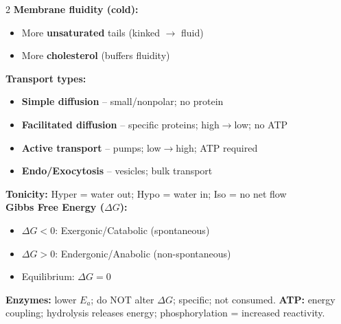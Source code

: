 \documentclass[11pt, letterpaper]{article}
\begin{document}
\begin{tcolorbox}[colback=part5bg, colframe=sectionteal,
  title={\bfseries Membranes, Transport \& Energy}, arc=3pt, boxrule=1pt]
\begin{multicols}{2}
\textbf{Membrane fluidity (cold):}
\begin{itemize}[noitemsep, leftmargin=*]
  \item More \textbf{unsaturated} tails (kinked $\to$ fluid)
  \item More \textbf{cholesterol} (buffers fluidity)
\end{itemize}
\textbf{Transport types:}
\begin{itemize}[noitemsep, leftmargin=*]
  \item \textbf{Simple diffusion} -- small/nonpolar; no protein
  \item \textbf{Facilitated diffusion} -- specific proteins; high$\to$low; no ATP
  \item \textbf{Active transport} -- pumps; low$\to$high; ATP required
  \item \textbf{Endo/Exocytosis} -- vesicles; bulk transport
\end{itemize}
\columnbreak
\textbf{Tonicity:} Hyper = water out; Hypo = water in; Iso = no net flow\\[4pt]
\textbf{Gibbs Free Energy ($\Delta G$):}
\begin{itemize}[noitemsep, leftmargin=*]
  \item $\Delta G < 0$: Exergonic/Catabolic (spontaneous)
  \item $\Delta G > 0$: Endergonic/Anabolic (non-spontaneous)
  \item Equilibrium: $\Delta G = 0$
\end{itemize}
\textbf{Enzymes:} lower $E_a$; do NOT alter $\Delta G$; specific; not consumed. \textbf{ATP:} energy coupling; hydrolysis releases energy; phosphorylation = increased reactivity.
\end{multicols}
\end{tcolorbox}


\vspace{4pt}
\end{document}

